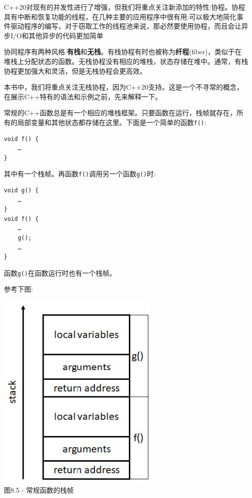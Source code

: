 
C++20对现有的并发性进行了增强，但我们将重点关注新添加的特性:协程。协程具有中断和恢复功能的线程，在几种主要的应用程序中很有用:可以极大地简化事件驱动程序的编写，对于窃取工作的线程池来说，那必然要使用协程，而且会让异步I/O和其他异步的代码更加简单


协同程序有两种风格:\textbf{有栈}和\textbf{无栈}。有栈协程有时也被称为\textbf{纤程}(fiber)，类似于在堆栈上分配状态的函数。无栈协程没有相应的堆栈，状态存储在堆中。通常，有栈协程更加强大和灵活，但是无栈协程会更高效。

本书中，我们将重点关注无栈协程，因为C++20支持。这是一个不寻常的概念，在展示C++特有的语法和示例之前，先来解释一下。

常规的C++函数总是有一个相应的堆栈框架。只要函数在运行，栈帧就存在，所有的局部变量和其他状态都存储在这里。下面是一个简单的函数\texttt{f()}:

\begin{lstlisting}[style=styleCXX]
void f() {
	…
}
\end{lstlisting}

其中有一个栈帧。再函数\texttt{f()}调用另一个函数\texttt{g()}时:

\begin{lstlisting}[style=styleCXX]
void g() {
	…
}
void f() {
	…
	g();
	…
}
\end{lstlisting}

函数\texttt{g()}在函数运行时也有一个栈帧。 

参考下图:

\begin{center}
\includegraphics[width=0.6\textwidth]{content/2/chapter8/images/5.jpg}\\
图8.5 - 常规函数的栈帧
\end{center}


